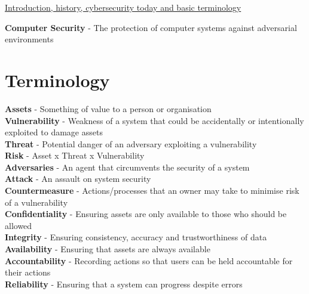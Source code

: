 \documentclass{article}[18pt]
\begin{document}
\begin{center}
\underline{\Large Introduction, history, cybersecurity today and basic terminology}
\end{center}
\textbf{Computer Security} - The protection of computer systems against adversarial environments
\section{Terminology}
\textbf{Assets} - Something of value to a person or organisation\\
\textbf{Vulnerability} - Weakness of a system that could be accidentally or intentionally exploited to damage assets\\
\textbf{Threat} - Potential danger of an adversary exploiting a vulnerability\\
\textbf{Risk} - Asset x Threat x Vulnerability\\
\textbf{Adversaries} - An agent that circumvents the security of a system\\
\textbf{Attack} - An assault on system security\\
\textbf{Countermeasure} - Actions/processes that an owner may take to minimise risk of a vulnerability\\
\textbf{Confidentiality} - Ensuring assets are only available to those who should be allowed\\
\textbf{Integrity} - Ensuring consistency, accuracy and trustworthiness of data\\
\textbf{Availability} - Ensuring that assets are always available\\
\textbf{Accountability} - Recording actions so that users can be held accountable for their actions\\ 
\textbf{Reliability} - Ensuring that a system can progress despite errors
\end{document}
